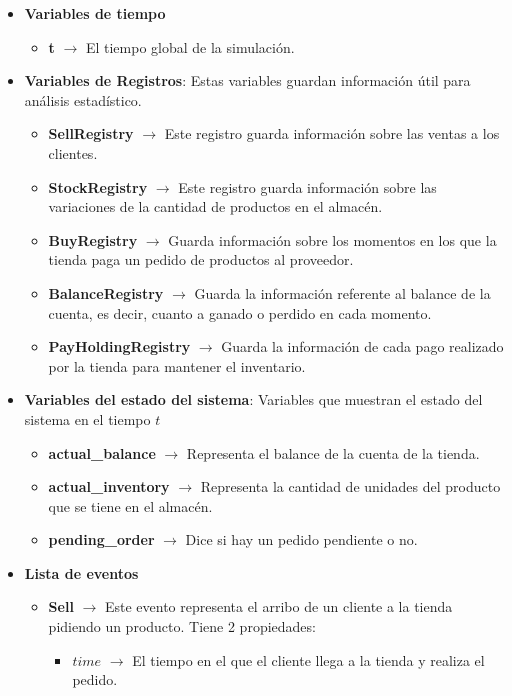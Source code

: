 \documentclass{article}
\begin{document}
\begin{itemize}
    \item \textbf{Variables de tiempo}
    \begin{itemize}
        \item \textbf{t} $\to$ El tiempo global de la simulación.
    \end{itemize}
    \item \textbf{Variables de Registros}: Estas variables guardan información útil para análisis estadístico.
    \begin{itemize}
        \item \textbf{SellRegistry} $\to$  Este registro guarda información sobre las ventas a los clientes.
        \item \textbf{StockRegistry} $\to$ Este registro guarda información sobre las variaciones de la cantidad de productos en el almacén.
        \item \textbf{BuyRegistry} $\to$ Guarda información sobre los momentos en los que la tienda paga un pedido de productos al proveedor.
        \item \textbf{BalanceRegistry} $\to$ Guarda la información referente al balance de la cuenta, es decir, cuanto a ganado o perdido en cada momento.
        \item \textbf{PayHoldingRegistry} $\to$ Guarda la información de cada pago realizado por la tienda para mantener el inventario.
    \end{itemize}
    \item \textbf{Variables del estado del sistema}: Variables que muestran el estado del sistema en el tiempo $t$
    \begin{itemize}
        \item \textbf{actual\_balance} $\to$ Representa el balance de la cuenta de la tienda.
        \item \textbf{actual\_inventory} $\to$ Representa la cantidad de unidades del producto que se tiene en el almacén.
        \item \textbf{pending\_order} $\to$ Dice si hay un pedido pendiente o no.
    \end{itemize}
    \item \textbf{Lista de eventos}
    \begin{itemize}
        \item \textbf{Sell} $\to$ Este evento representa el arribo de un cliente a la tienda pidiendo un producto. Tiene 2 propiedades:
        \begin{itemize}
            \item $time$ $\to$ El tiempo en el que el cliente llega a la tienda y realiza el pedido.

\end{itemize}
\end{itemize}
\end{itemize}
\end{document}
